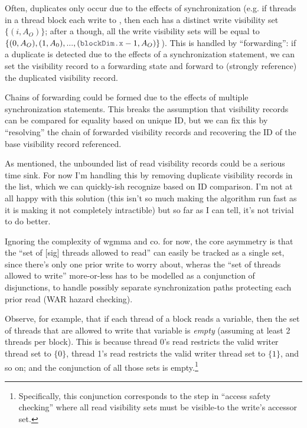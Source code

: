 \filbreak
Often, duplicates only occur due to the effects of synchronization (e.g. if threads in a thread block each write to , then each  has a distinct write visibility set ${\{(i, A_O)\}}$; after a  though, all the write visibility sets will be equal to ${\{(0, A_O), (1, A_0), ... ,(\lighttt{blockDim.x}-1, A_O)\}}$).
This is handled by ``forwarding'': if a duplicate is detected due to the effects of a synchronization statement, we can set the visibility record to a forwarding state and forward to (strongly reference) the duplicated visibility record.

\filbreak
Chains of forwarding could be formed due to the effects of multiple synchronization statements.
This breaks the assumption that visibility records can be compared for equality based on unique ID, but we can fix this by ``resolving'' the chain of forwarded visibility records and recovering the ID of the base visibility record referenced.

\filbreak
{} As mentioned, the unbounded list of read visibility records could be a serious time sink.
For now I'm handling this by removing duplicate visibility records in the list, which we can quickly-ish recognize based on ID comparison.
I'm not at all happy with this solution (this isn't so much making the algorithm run fast as it is making it not completely intractible) but so far as I can tell, it's not trivial to do better.

\filbreak
Ignoring the complexity of wgmma and co. for now, the core asymmetry is that the ``set of [sig] threads allowed to read'' can easily be tracked as a single set, since there's only one prior write to worry about, wheras the ``set of threads allowed to write'' more-or-less has to be modelled as a conjunction of disjunctions, to handle possibly separate synchronization paths protecting each prior read (WAR hazard checking).

\filbreak
Observe, for example, that if each thread of a block reads a variable, then the set of threads that are allowed to write that variable is \textit{empty} (assuming at least 2 threads per block).
This is because thread 0's read restricts the valid writer thread set to $\{0\}$, thread 1's read restricts the valid writer thread set to $\{1\}$, and so on; and the conjunction of all those sets is empty.\footnote{Specifically, this conjunction corresponds to the step in ``access safety checking'' where all read visibility sets must be visible-to the write's accessor set.}

